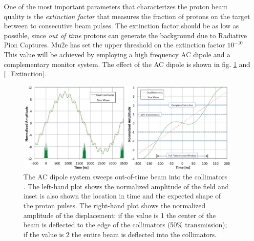 \documentclass[12pt,a4paper,openright, oneside, titlepage]{book} %
\begin{document}
\noindent 
One of the most important parameters that characterizes the proton beam quality is the 
\textit{extinction factor} that measures the fraction of protons on the
target between to consecutive beam pulses. The extinction factor should be 
as low as possible, since \textit{out of time} protons can generate the background due to Radiative Pion Captures. 
Mu2e has set the upper threshold on the extinction factor $10^{-10}$. 
This value will be achieved by employing a high frequency AC dipole and a complementary monitor system. The effect of the AC dipole is shown in fig. \ref{_AC_dipole} and \ref{_Extinction}.\\

\begin{figure}[h!]
\centering
\includegraphics[scale=0.5]{AC_dipole}
\caption{The AC dipole system sweeps out-of-time beam into the collimators \cite{bob_mu2e}. 
The left-hand plot shows the normalized amplitude of the field and inset is also shown
the location in time and the expected shape of the proton pulses. 
The right-hand plot shows the normalized amplitude of the displacement: 
if the value is 1 the center of the beam is deflected to the edge of the collimators (50\% transmission); 
if the value is 2 the entire beam is deflected into the collimators.}
\label{_AC_dipole}
\end{figure}
\end{document}
